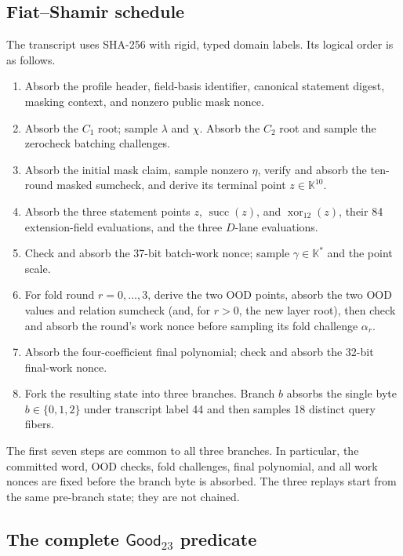 \subsection{Fiat--Shamir schedule}

The transcript uses SHA-256 with rigid, typed domain labels.  Its logical
order is as follows.
\begin{enumerate}
  \item Absorb the profile header, field-basis identifier, canonical statement
        digest, masking context, and nonzero public mask nonce.
  \item Absorb the \(C_1\) root; sample \(\lambda\) and \(\chi\).  Absorb the
        \(C_2\) root and sample the zerocheck batching challenges.
  \item Absorb the initial mask claim, sample nonzero \(\eta\), verify and
        absorb the ten-round masked sumcheck, and derive its terminal point
        \(z\in\mathbb K^{10}\).
  \item Absorb the three statement points \(z\), \(\operatorname{succ}(z)\),
        and \(\operatorname{xor}_{12}(z)\), their 84 extension-field
        evaluations, and the three \(D\)-lane evaluations.
  \item Check and absorb the 37-bit batch-work nonce; sample
        \(\gamma\in\mathbb K^*\) and the point scale.
  \item For fold round \(r=0,\ldots,3\), derive the two OOD points, absorb
        the two OOD values and relation sumcheck (and, for \(r>0\), the new
        layer root), then check and absorb the round's work nonce before
        sampling its fold challenge \(\alpha_r\).
  \item Absorb the four-coefficient final polynomial; check and absorb the
        32-bit final-work nonce.
  \item Fork the resulting state into three branches.  Branch \(b\) absorbs
        the single byte \(b\in\{0,1,2\}\) under transcript label 44 and then
        samples 18 distinct query fibers.
\end{enumerate}
The first seven steps are common to all three branches.  In particular, the
committed word, OOD checks, fold challenges, final polynomial, and all work
nonces are fixed before the branch byte is absorbed.  The three replays start
from the same pre-branch state; they are not chained.

\subsection{The complete \texorpdfstring{\(\mathsf{Good}_{23}\)}{Good23} predicate}

